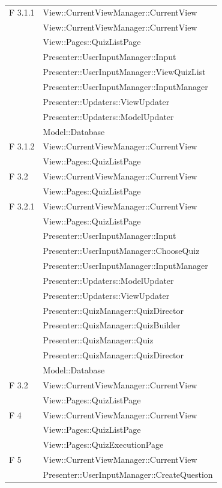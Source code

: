 \documentclass[a4paper,11pt]{article}
\begin{document}
\begin{longtable}{p{}p{}}
F 3.1.1 & View::CurrentViewManager::CurrentView\\
		& View::CurrentViewManager::CurrentView\\
		& View::Pages::QuizListPage\\
		& Presenter::UserInputManager::Input\\
			& Presenter::UserInputManager::ViewQuizList\\
			& Presenter::UserInputManager::InputManager\\
			& Presenter::Updaters::ViewUpdater\\
			& Presenter::Updaters::ModelUpdater\\
			& Model::Database\\
\midrule
F 3.1.2 & View::CurrentViewManager::CurrentView\\
			& View::Pages::QuizListPage\\
\midrule			
F 3.2 & View::CurrentViewManager::CurrentView\\
			& View::Pages::QuizListPage\\			
\midrule						
F 3.2.1 & View::CurrentViewManager::CurrentView\\
		& View::Pages::QuizListPage\\	
		& Presenter::UserInputManager::Input\\
		& Presenter::UserInputManager::ChooseQuiz\\
		& Presenter::UserInputManager::InputManager\\
		& Presenter::Updaters::ModelUpdater\\
		& Presenter::Updaters::ViewUpdater\\
		& Presenter::QuizManager::QuizDirector\\
		& Presenter::QuizManager::QuizBuilder\\
		& Presenter::QuizManager::Quiz\\
		& Presenter::QuizManager::QuizDirector\\
		& Model::Database\\
\midrule
F 3.2 & View::CurrentViewManager::CurrentView\\
		& View::Pages::QuizListPage\\		
\midrule	
F 4		& View::CurrentViewManager::CurrentView\\
		& View::Pages::QuizListPage\\
		& View::Pages::QuizExecutionPage\\
\midrule
F 5		& View::CurrentViewManager::CurrentView\\
		& Presenter::UserInputManager::CreateQuestion\\

\end{longtable}
\end{document}
